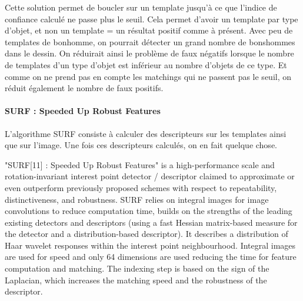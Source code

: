 Cette solution permet de boucler sur un template jusqu'à ce que l'indice de confiance calculé ne passe plus le seuil. Cela permet d'avoir un template par type d'objet, et non un template = un résultat positif comme à présent. Avec peu de templates de bonhomme, on pourrait détecter un grand nombre de bonshommes dans le dessin. On réduirait ainsi le problème de faux négatifs lorsque le nombre de templates d'un type d'objet est inférieur au nombre d'objets de ce type. Et comme on ne prend pas en compte les matchings qui ne passent pas le seuil, on réduit également le nombre de faux positifs.\\


\paragraph{SURF : Speeded Up Robust Features\\}
L'algorithme SURF consiste à calculer des descripteurs sur les templates ainsi que sur l'image. Une fois ces descripteurs calculés, on en fait quelque chose.

"SURF[11] : Speeded Up Robust Features" is a high-performance scale and rotation-invariant interest point detector / descriptor claimed to approximate or even outperform previously proposed schemes with respect to repeatability, distinctiveness, and robustness. SURF relies on integral images for image convolutions to reduce computation time, builds on the strengths of the leading existing detectors and descriptors (using a fast Hessian matrix-based measure for the detector and a distribution-based descriptor). It describes a distribution of Haar wavelet responses within the interest point neighbourhood. Integral images are used for speed and only 64 dimensions are used reducing the time for feature computation and matching. The indexing step is based on the sign of the Laplacian, which increases the matching speed and the robustness of the descriptor.

